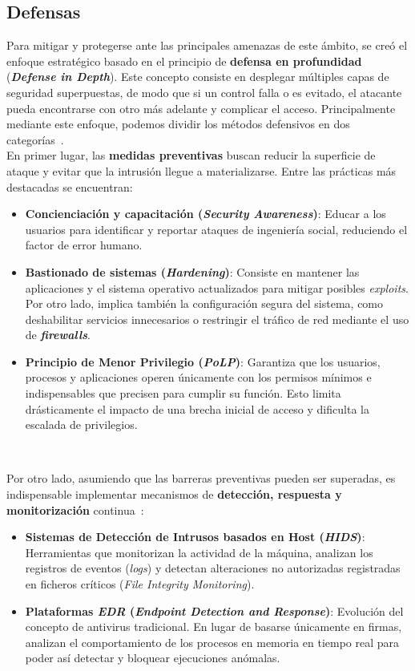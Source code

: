 \subsection{Defensas}
\label{sec:defensas}

Para mitigar y protegerse ante las principales amenazas de este ámbito, se creó el enfoque estratégico basado en el principio de \textbf{defensa en profundidad} (\textbf{\textit{Defense in Depth}}).
Este concepto consiste en desplegar múltiples capas de seguridad superpuestas, de modo que si un control falla o es evitado, el atacante pueda encontrarse con otro más adelante y complicar el acceso.
Principalmente mediante este enfoque, podemos dividir los métodos defensivos en dos categorías~\cite{nist_sec_controls}.\\

En primer lugar, las \textbf{medidas preventivas} buscan reducir la superficie de ataque y evitar que la intrusión llegue a materializarse. Entre las prácticas más destacadas se encuentran:
\begin{itemize}
    \item \textbf{Concienciación y capacitación (\textit{Security Awareness})}: Educar a los usuarios para identificar y reportar ataques de ingeniería social, reduciendo el factor de error humano.
    \item \textbf{Bastionado de sistemas (\textit{Hardening})}: Consiste en mantener las aplicaciones y el sistema operativo actualizados para mitigar posibles \textit{exploits}.
    Por otro lado, implica también la configuración segura del sistema, como deshabilitar servicios innecesarios o restringir el tráfico de red mediante el uso de \textbf{\textit{firewalls}}.
    \item \textbf{Principio de Menor Privilegio (\textit{PoLP})}: Garantiza que los usuarios, procesos y aplicaciones operen únicamente con los permisos mínimos e indispensables que precisen para cumplir su función.
    Esto limita drásticamente el impacto de una brecha inicial de acceso y dificulta la escalada de privilegios.
\end{itemize}

\

Por otro lado, asumiendo que las barreras preventivas pueden ser superadas, es indispensable implementar mecanismos de \textbf{detección, respuesta y monitorización} continua~\cite{nist_detection}:
\begin{itemize}
    \item \textbf{Sistemas de Detección de Intrusos basados en Host (\textit{HIDS})}: Herramientas que monitorizan la actividad de la máquina, analizan los registros de eventos (\textit{logs}) y detectan alteraciones no autorizadas registradas en ficheros críticos (\textit{File Integrity Monitoring}).
    \item \textbf{Plataformas \textit{EDR} (\textit{Endpoint Detection and Response})}: Evolución del concepto de antivirus tradicional. En lugar de basarse únicamente en firmas, analizan el comportamiento de los procesos en memoria en tiempo real para poder así detectar y bloquear ejecuciones anómalas.
\end{itemize}

